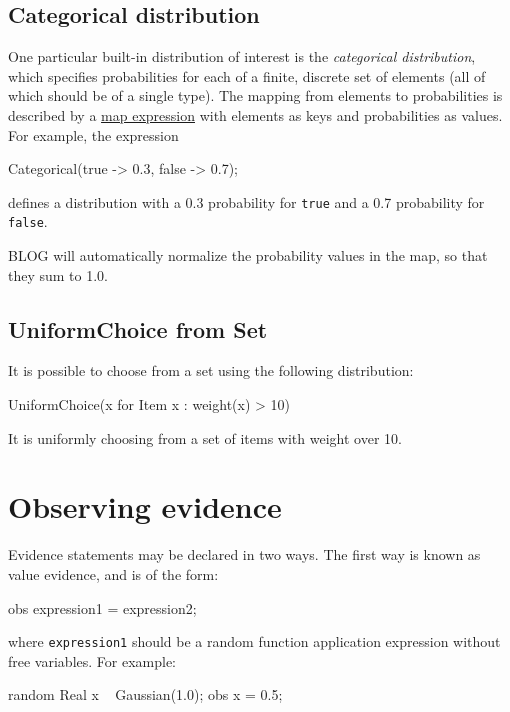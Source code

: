 \documentclass[12pt]{article}
\begin{document}
\subsection{Categorical distribution}\label{categorical-section}

One particular built-in distribution of interest is the
{\em categorical distribution}, which specifies probabilities for each
of a finite, discrete set of elements (all of which should be of a
single type). The mapping from elements to probabilities is described
by a \hyperref[map-section]{map expression} with elements as keys and
probabilities as values. For example, the expression
\begin{blogcode}
Categorical({true -> 0.3, false -> 0.7});
\end{blogcode}
defines a distribution with a 0.3 probability for {\tt true} and a 0.7
probability for {\tt false}.

BLOG will automatically normalize the probability values in the map, so that
they sum to 1.0.


\subsection{UniformChoice from Set} \label{uniformchoice-section}
It is possible to choose from a set using the following distribution:
\begin{blogcode}
UniformChoice({x for Item x : weight(x) > 10})
\end{blogcode}
It is uniformly choosing from a set of items with weight over 10. 











\section{Observing evidence}\label{evidence-section}
Evidence statements may be declared in two ways.  The first way is known as
value evidence, and is of the form:
\begin{blogcode}
obs expression1 = expression2;
\end{blogcode}
where \texttt{expression1} should be a random function application expression
without free variables.  For example:
\begin{blogcode}
random Real x ~ Gaussian(1.0);
obs x = 0.5;
\end{blogcode}
\end{document}
